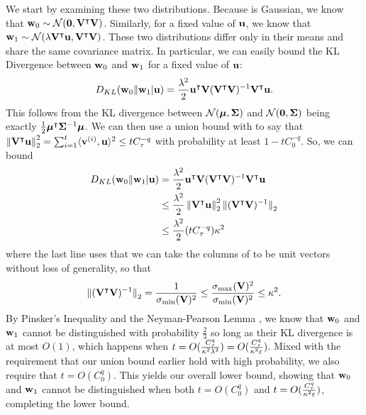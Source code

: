 We start by examining these two distributions.
Because \vg is Gaussian, we know that \(\boldsymbol{\mathrm{w}}_0 \sim {\mathcal N}(\boldsymbol{\mathrm{0}},\mathbf{V}^\intercal\mathbf{V})\).
Similarly, for a fixed value of \(\boldsymbol{\mathrm{u}}\), we know that \(\boldsymbol{\mathrm{w}}_1 \sim {\mathcal N}(\lambda\mathbf{V}^\intercal\boldsymbol{\mathrm{u}}, \mathbf{V}^\intercal\mathbf{V})\).
These two distributions differ only in their means and share the same covariance matrix.
In particular, we can easily bound the KL Divergence between \(\boldsymbol{\mathrm{w}}_0\) and \(\boldsymbol{\mathrm{w}}_1\) for a fixed value of \(\boldsymbol{\mathrm{u}}\):
\begin{equation}
    D_{KL}(\boldsymbol{\mathrm{w}}_0\|\boldsymbol{\mathrm{w}}_1|\boldsymbol{\mathrm{u}})
    = \frac{\lambda^2}{2} \boldsymbol{\mathrm{u}}^\intercal\mathbf{V}(\mathbf{V}^\intercal\mathbf{V})^{-1}\mathbf{V}^\intercal\boldsymbol{\mathrm{u}}.
    \label{eqn:nonadaptive-dkl}
\end{equation}
This follows from the KL divergence between \({\mathcal N}(\boldsymbol{\mu},\mathbf{\Sigma})\) and \({\mathcal N}(\boldsymbol{\mathrm{0}},\mathbf{\Sigma})\) being exactly \(\frac12 \boldsymbol{\mu}^\intercal\mathbf{\Sigma}^{-1}\boldsymbol{\mu}\).
We can then use a union bound with  to say that \(\norm{\mV^\intercal\vu}_2^2 = \sum_{i=1}^t \langle \vv^{(i)}, \vu\rangle^2 \leq t C_\tau^{-q}\) with probability at least \(1-tC_0^{-q}\).
So, we can bound
\begin{align*}
    D_{KL}(\vw_0\|\vw_1|\vu)
    &= \frac{\lambda^2}{2} \vu^\intercal\mV(\mV^\intercal\mV)^{-1}\mV^\intercal\vu \\
    &\leq \frac{\lambda^2}{2} \norm{\mV^\intercal\vu}_2^2 \norm{(\mV^\intercal\mV)^{-1}}_2 \\
    &\leq \frac{\lambda^2}{2} (t C_\tau^{-q}) \kappa^2
\end{align*}
where the last line uses that we can take the columns of \mV to be unit vectors without loss of generality, so that
\[
    \norm{(\mV^\intercal\mV)^{-1}}_2
    = \frac{1}{\sigma_{\min}(\mV)^2}
    \leq \frac{\sigma_{\max}(\mV)^2}{\sigma_{\min}(\mV)^2}
    \leq \kappa^2.
\]
By Pinsker's Inequality and the Neyman-Pearson Lemma \cite{csiszar2011information, neyman1933ix}, we know that \(\boldsymbol{\mathrm{w}}_0\) and \(\boldsymbol{\mathrm{w}}_1\) cannot be distinguished with probability \(\frac23\) so long as their KL divergence is at most \(O(1)\), which happens when \(t = O(\frac{C_\tau^q}{\kappa^2\lambda^2}) = O(\frac{C_\tau^q}{\kappa^2\varepsilon})\).
Mixed with the requirement that our union bound earlier hold with high probability, we also require that \(t = O(C_0^q)\).
This yields our overall lower bound, showing that \(\boldsymbol{\mathrm{w}}_0\) and \(\boldsymbol{\mathrm{w}}_1\) cannot be distinguished when both \(t = O(C_0^q)\) and \(t = O(\frac{C_\tau^q}{\kappa^2\varepsilon})\), completing the lower bound.

